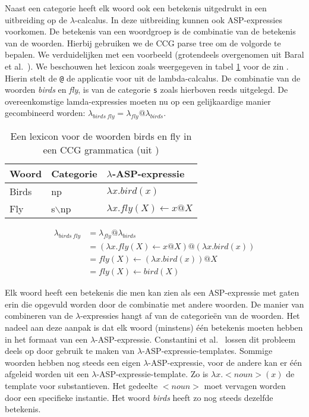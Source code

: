 Naast een categorie heeft elk woord ook een betekenis uitgedrukt in een uitbreiding op de $\lambda$-calcalus. In deze uitbreiding kunnen ook ASP-expressies voorkomen. De betekenis van een woordgroep is de combinatie van de betekenis van de woorden. Hierbij gebruiken we de CCG parse tree om de volgorde te bepalen. We verduidelijken met een voorbeeld (grotendeels overgenomen uit Baral et al.\ \cite{Baral2008}). We beschouwen het lexicon zoals weergegeven in tabel \ref{table:CCG} voor de zin . Hierin stelt de \texttt{@} de applicatie voor uit de lambda-calcalus. De combinatie van de woorden \textit{birds} en \textit{fly}, is van de categorie \texttt{s} zoals hierboven reeds uitgelegd. De overeenkomstige lamda-expressies moeten nu op een gelijkaardige manier gecombineerd worden: $\lambda_{birds\ fly}=\lambda_{fly}@\lambda_{birds}$.

\begin{table}
  \centering
  \begin{tabular}{|l|l|l|}
    \hline
    Woord & Categorie & $\lambda$-ASP-expressie \\
    \hline
    \hline
    Birds & np & $\lambda x.bird(x)$ \\
    Fly & s$\backslash$np & $\lambda x.fly(X) \leftarrow x@X$ \\
    \hline
  \end{tabular}
  \caption{Een lexicon voor de woorden birds en fly in een CCG grammatica (uit \cite{Baral2008})}
  \label{table:CCG}
\end{table}

\begin{equation}
  \label{eq:lambda}
  \begin{aligned}
  \lambda_{birds\ fly} &= \lambda_{fly}@\lambda_{birds} \\
          &= (\lambda x.fly(X) \leftarrow x@X)@(\lambda x.bird(x)) \\
          &= fly(X) \leftarrow (\lambda x.bird(x))@X \\
          &= fly(X) \leftarrow bird(X)
  \end{aligned}
\end{equation}

Elk woord heeft een betekenis die men kan zien als een ASP-expressie met gaten erin die opgevuld worden door de combinatie met andere woorden. De manier van combineren van de $\lambda$-expressies hangt af van de categorie\"en van de woorden. Het nadeel aan deze aanpak is dat elk woord (minstens) \'e\'en betekenis moeten hebben in het formaat van een $\lambda$-ASP-expressie. Constantini et al.\ \cite{Costantini2010} lossen dit probleem deels op door gebruik te maken van $\lambda$-ASP-expressie-templates. Sommige woorden hebben nog steeds een eigen $\lambda$-ASP-expressie, voor de andere kan er \'e\'en afgeleid worden uit een $\lambda$-ASP-expressie-template. Zo is $\lambda x. <noun>(x)$ de template voor substantieven. Het gedeelte $<noun>$ moet vervagen worden door een specifieke instantie. Het woord \textit{birds} heeft zo nog steeds dezelfde betekenis.

